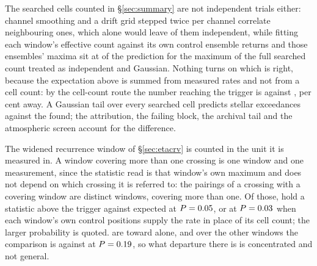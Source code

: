 The searched cells counted in \S\ref{sec:summary} are not independent trials
either: channel smoothing and a drift grid stepped twice per channel
correlate neighbouring ones, which alone would leave \StGridFrac{} of them
independent, while fitting each window's effective count against its own
control ensemble returns \StNindFrac{} and those ensembles' maxima sit at
\CtrlMaxRatioMed{} of the prediction for the maximum of the full searched
count treated as independent and Gaussian. Nothing turns on which is right,
because the expectation above is summed from measured rates and not from a
cell count: by the cell-count route the number reaching the trigger is
\StExpModel{} against \CeExpTrig, \StModelAgreePct{} per cent away. A
Gaussian tail over every searched cell predicts \CellExpect{} stellar
exceedances against the \NCross{} found; the attribution, the failing block,
the archival tail and the atmospheric screen account for the difference.

The widened recurrence window of \S\ref{sec:etacrv} is counted in the unit it
is measured in. A window covering more than one crossing is one
window and one measurement, since the statistic read is that window's own
maximum and does not depend on which crossing it is referred to: the
\WuNRead{} pairings of a crossing with a covering window are \WuNWin{}
distinct windows, \WuNMulti{} covering more than one. Of those, \WuNWinExc{}
hold a statistic above the trigger against \WuExpWin{} expected at
$P=0.05$, or \WuExpWinCtrl{} at $P=0.03$ when each window's
own control positions supply the rate in place of its cell count; the larger
probability is quoted. \WuNWinExcTwo{} are toward \WuTwoStars{} alone, and
over the other \WuNWinRest{} windows the comparison is \WuNWinRestExc{}
against \WuExpRest{} at $P=0.19$, so what departure there is is
concentrated and not general.

